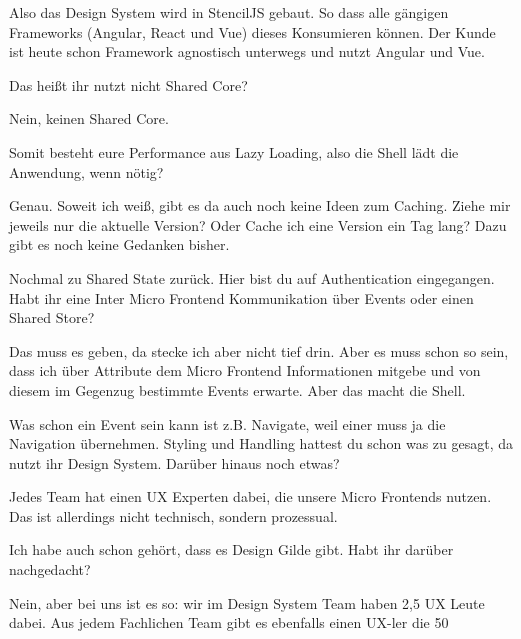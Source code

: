 \begin{description}
    \PhilippHuber Also das Design System wird in StencilJS gebaut. So dass alle gängigen Frameworks (Angular, React und Vue) dieses Konsumieren können. Der Kunde ist heute schon Framework agnostisch unterwegs und nutzt Angular und Vue.

    \NicoVogel Das heißt ihr nutzt nicht Shared Core?

    \PhilippHuber Nein, keinen Shared Core.

    \NicoVogel Somit besteht eure Performance aus Lazy Loading, also die Shell lädt die Anwendung, wenn nötig?

    \PhilippHuber Genau. Soweit ich weiß, gibt es da auch noch keine Ideen zum Caching. Ziehe mir jeweils nur die aktuelle Version? Oder Cache ich eine Version ein Tag lang? Dazu gibt es noch keine Gedanken bisher.

    \NicoVogel Nochmal zu Shared State zurück. Hier bist du auf Authentication eingegangen. Habt ihr eine Inter Micro Frontend Kommunikation über Events oder einen Shared Store?

    \PhilippHuber Das muss es geben, da stecke ich aber nicht tief drin. Aber es muss schon so sein, dass ich über Attribute dem Micro Frontend Informationen mitgebe und von diesem im Gegenzug bestimmte Events erwarte. Aber das macht die Shell.

    \NicoVogel Was schon ein Event sein kann ist z.B. Navigate, weil einer muss ja die Navigation übernehmen. Styling und Handling hattest du schon was zu gesagt, da nutzt ihr Design System. Darüber hinaus noch etwas?

    \PhilippHuber Jedes Team hat einen UX Experten dabei, die unsere Micro Frontends nutzen. Das ist allerdings nicht technisch, sondern prozessual.

    \NicoVogel Ich habe auch schon gehört, dass es Design Gilde gibt. Habt ihr darüber nachgedacht?

    \PhilippHuber Nein, aber bei uns ist es so: wir im Design System Team haben 2,5 UX Leute dabei. Aus jedem Fachlichen Team gibt es ebenfalls einen UX-ler die 50%


\end{description}
